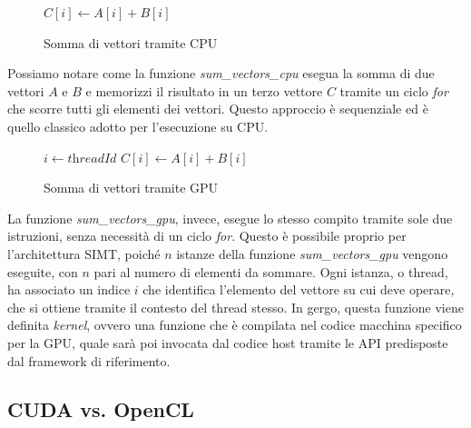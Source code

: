 \begin{figure}[h!]
  \begin{algorithm}
    [H]
    \caption{Somma di vettori tramite CPU}
    \label{alg:sumvectorscpu}
    \begin{algorithmic}
        \State
      $C[i] \gets A[i] + B[i]$ \EndFor \EndFunction
    \end{algorithmic}
  \end{algorithm}
  \vspace{-1em}
\end{figure}

Possiamo notare come la funzione \textit{sum\_vectors\_cpu} esegua la somma di
due vettori $A$ e $B$ e memorizzi il risultato in un terzo vettore $C$ tramite
un ciclo \textit{for} che scorre tutti gli elementi dei vettori. Questo
approccio è sequenziale ed è quello classico adotto per l'esecuzione su CPU.

\begin{figure}[h!]
  \vspace{1em}
  \begin{algorithm}
    [H]
    \caption{Somma di vettori tramite GPU}
    \label{alg:sumvectorsgpu}
    \begin{algorithmic}
       \State $i \gets \textit{threadId}$ \State
      $C[i] \gets A[i] + B[i]$ \EndFunction
    \end{algorithmic}
  \end{algorithm}
  \vspace{1em}
\end{figure}

La funzione \textit{sum\_vectors\_gpu}, invece, esegue lo stesso compito tramite
sole due istruzioni, senza necessità di un ciclo \textit{for}. Questo è possibile
proprio per l'architettura SIMT, poiché $n$ istanze della funzione \textit{sum\_vectors\_gpu}
vengono eseguite, con $n$ pari al numero di elementi da sommare. Ogni istanza, o
thread, ha associato un indice $i$ che identifica l'elemento del vettore su cui deve
operare, che si ottiene tramite il contesto del thread stesso. In gergo, questa
funzione viene definita \textit{kernel}, ovvero una funzione che è compilata nel
codice macchina specifico per la GPU, quale sarà poi invocata dal codice host tramite
le API predisposte dal framework di riferimento.

\subsection{CUDA vs. OpenCL}
\label{subsec:cudavsopencl}


